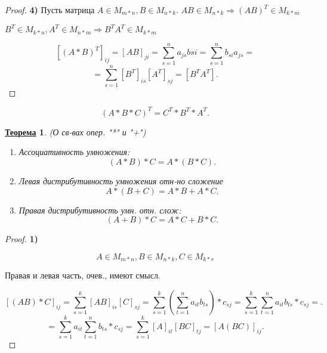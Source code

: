 \documentclass[12pt]{article}
\newtheorem{theorem}{\underline{Теорема}}[section]
\theoremstyle{definition}
\theoremstyle{definition}
\begin{document}
\begin{proof}
\textbf{4)} Пусть матрица $A \in M_{m * n}, B \in M_{n * k}$. $AB \in M_{n * k} \Rightarrow (AB)^{T}\in M_{k * m}$ 

$B^{T} \in M_{k * n}, A^{T} \in M_{n * m} \Rightarrow B^{T}A^{T} \in M_{k * m}$ 

\[
    [(A * B)^{T}]_{ij} = [AB]_{ji} = \sum_{s = 1}^{n}a_{js}b{si} = \sum_{s = 1}^{n}b_{si}a_{js} =
\] 
\[
    = \sum_{s = 1}^{n}[B^{T}]_{is}[A^{T}]_{sj} = [B^{T}A^{T}]
.\] 
\end{proof}

\[
    (A * B * C)^{T} = C^{T} * B^{T} * A^{T}
.\] 

\begin{theorem} (О св-вах опер. "*" и "+")
\begin{enumerate}
    \item Ассоциативность умножения:
        \[
            (A * B) * C = A * (B * C)
        .\] 
    \item Левая дистрибутивность умножения отн-но сложение
        \[
        A * (B + C) = A * B + A * C
        .\] 
    \item Правая дистрибутивность умн. отн. слож:
        \[
            (A + B) * C = A * C + B * C
        .\] 
\end{enumerate}

\end{theorem}

\begin{proof}
    \textbf{1)}
    
    \[
        A \in M_{m * n}, B \in M_{n * k}, C \in M_{k * r}
    \]

Правая и левая часть, очев., имеют смысл.

\[
[(AB) * C]_{ij} = \sum_{s = 1}^{k} [AB]_{is}[C]_{sj} = \sum_{s = 1}^{k} (\sum_{t = 1}^{n} a_{it}b_{ts}) * c_{sj} = \sum_{s = 1}^{k} \sum_{t = 1}^{n}  a_{it} b_{ts} * c_{sj} = 
.\] 
\[
= \sum_{s = 1}^{k} a_{it} \sum_{t = 1}^{n} b_{ts} * c_{sj} = \sum_{s = 1}^{k} [A]_{it}[BC]_{tj} = [A(BC)]_{ij}
.\] 
\end{proof}
\end{document}
